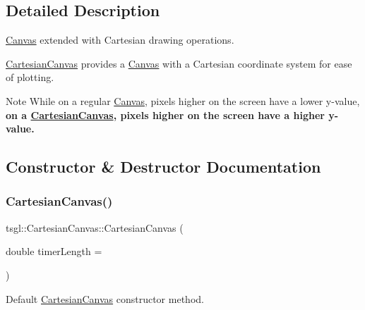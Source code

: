 \subsection{Detailed Description}
\hyperlink{classtsgl_1_1_canvas}{Canvas} extended with Cartesian drawing operations. 

\hyperlink{classtsgl_1_1_cartesian_canvas}{Cartesian\+Canvas} provides a \hyperlink{classtsgl_1_1_canvas}{Canvas} with a Cartesian coordinate system for ease of plotting. \begin{DoxyNote}{Note}
While on a regular \hyperlink{classtsgl_1_1_canvas}{Canvas}, pixels higher on the screen have a lower y-\/value, {\bfseries on a \hyperlink{classtsgl_1_1_cartesian_canvas}{Cartesian\+Canvas}, pixels higher on the screen have a higher y-\/value.} 
\end{DoxyNote}


\subsection{Constructor \& Destructor Documentation}
\mbox{\label{classtsgl_1_1_cartesian_canvas_a4438f368eae3def6a70e0faa15d28daa}} 
\subsubsection{\texorpdfstring{Cartesian\+Canvas()}{CartesianCanvas()}\hspace{0.1cm}{\footnotesize\ttfamily [1/2]}}
{\footnotesize\ttfamily tsgl\+::\+Cartesian\+Canvas\+::\+Cartesian\+Canvas (\begin{DoxyParamCaption}\item[{double}]{timer\+Length = {} }\end{DoxyParamCaption})}



Default \hyperlink{classtsgl_1_1_cartesian_canvas}{Cartesian\+Canvas} constructor method. 

